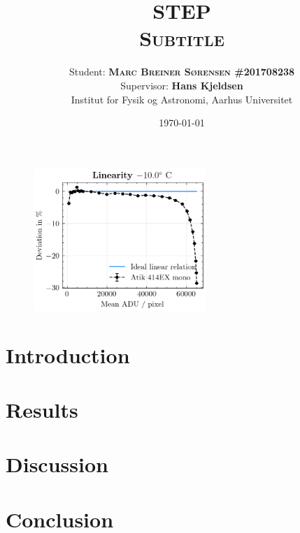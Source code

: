 \documentclass[12pt, a4paper, twoside, article]{memoir}
\title{\textsc{\textbf{STEP} \\ \normalsize Subtitle}}
\author{\normalsize Student: \textbf{\textsc{Marc Breiner Sørensen
			\#\small\textsf{201708238}}}\\
	\normalsize Supervisor: \textbf{Hans Kjeldsen}\\
	\normalsize Institut for Fysik og Astronomi, Aarhus Universitet}
\date{\textsc{\textsf{\today}}}
\begin{document}
	\maketitle
	\begin{figure}[h!]
		\centering
		\includegraphics[width=0.58\textwidth]{linearity.png}
	\end{figure}
	\thispagestyle{empty}
	
	
	\newpage
	\tableofcontents
	
	\newpage
	
	
	
	\newpage
	
	\chapter{Introduction}
	\newpage
	
	
	\newpage
	
	
	\newpage
	
	\chapter{Results}
	\newpage
	
	\chapter{Discussion}
	\newpage
	
	\chapter{Conclusion}
	
	
	\newpage
	
\end{document}
